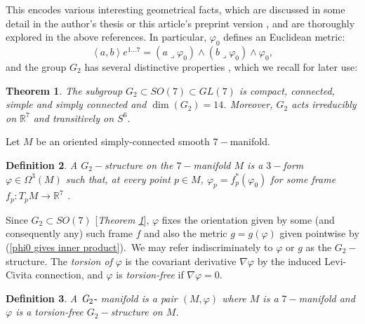 \documentclass{article}
\newtheorem{theorem}{Theorem}
\newtheorem{definition}[theorem]{Definition}
\begin{document}
This encodes various interesting geometrical facts, which are discussed in some detail in the author's thesis \cite{MyThesis} or this article's preprint version  \cite{G2I}, and are thoroughly explored in the above references. In particular, $\varphi _{0}$ defines an Euclidean metric:
\begin{equation}        \label{phi0 gives inner product}
        \left\langle a,b\right\rangle e^{1...7}
        =\left( a\lrcorner \varphi_{0}\right) 
        \wedge \left( b\lrcorner \varphi _{0}\right) 
        \wedge \varphi _{0},
\end{equation}%
and the group   $G_{2}$  has several distinctive properties \cite{Bryant}, which we recall for later use:%
\begin{theorem}         \label{thm properties of G2}
The subgroup $G_{2}\subset SO(7)\subset GL(7)$
is compact, connected, simple and simply connected and $\dim(G_2)=14$.
Moreover, $G_{2}$ acts irreducibly on $\mathbb{R}^{7}$ and transitively on $%
S^{6}$.
\end{theorem}


\label{Sect G2-manifolds}

Let $M$ be an oriented simply-connected smooth $7-$manifold. 
\begin{definition}      \label{def G2-structure}
A $G_{2}-$\emph{structure} on the $%
7-$manifold $M$ is a $3-$form $\varphi \in \Omega ^{3}\left( M\right) $ such
that, at every point $p\in M$, $\varphi  _{p}=f_{p}^{\ast }\left(
\varphi _{0}\right) $ for some frame $f_{p}:T_{p}M\rightarrow \mathbb{R}^{7}$%
.
\end{definition}

Since $G_{2}\subset
SO\left( 7\right) $ [\emph{Theorem \ref{thm properties of G2}}], $\varphi $ fixes
the orientation given by some (and consequently any) such frame $f$ and also
the metric $g=g\left( \varphi \right) $ given pointwise by (\ref{phi0 gives inner product}).\emph{\ }We may refer indiscriminately to $\varphi$ or $g$ as the $G_{2}-$structure.
The \emph{torsion of }$\varphi $ is the covariant derivative $\nabla
\varphi $ by the induced Levi-Civita connection, and $\varphi $ is \emph{torsion-free }if $\nabla \varphi
=0$.

\begin{definition}
A $\emph{G}_{2}\emph{-}$\emph{%
manifold} is a pair $\left( M,\varphi \right) $ where $M$ is a $7-$manifold
and $\varphi $ is a torsion-free $G_{2}-$structure on $M$.
\end{definition}
\end{document}
